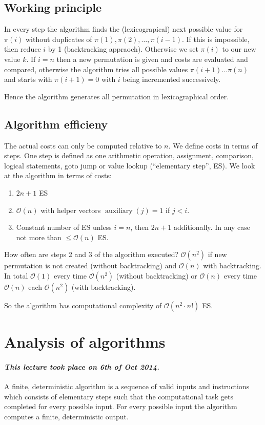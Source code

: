 \documentclass{article}
\newcommand{\dateref}[1]{\paragraph{\textit{This lecture took place on #1.}}}
\begin{document}
\subsection{Working principle}
%
In every step the algorithm finds the (lexicograpical) next possible value for $\pi(i)$ without duplicates of $\pi(1), \pi(2), \ldots, \pi(i-1)$. If this is impossible, then reduce $i$ by 1 (backtracking appraoch). Otherwise we set $\pi(i)$ to our new value $k$. If $i = n$ then a new permutation is given and costs are evaluated and compared, otherwise the algorithm tries all possible values $\pi(i+1)\ldots \pi(n)$ and starts with $\pi(i+1) = 0$ with $i$ being incremented successively.

Hence the algorithm generates all permutation in lexicographical order.

\subsection{Algorithm efficieny}
%
The actual costs can only be computed relative to $n$. We define costs in terms of steps. One step is defined as one arithmetic operation, assignment, comparison, logical statements, goto jump or value lookup (``elementary step'', ES). We look at the algorithm in terms of costs:

\begin{enumerate}
  \item $2n + 1$ ES
  \item $\mathcal{O}(n)$ with helper vectors $\operatorname{auxiliary}(j) = 1$ if $j < i$.
  \item Constant number of ES unless $i=n$, then $2n + 1$ additionally. In any case not more than $\leq \mathcal{O}(n)$ ES.
\end{enumerate}

How often are steps 2 and 3 of the algorithm executed? $\mathcal{O}(n^2)$ if new permutation is not created (without backtracking) and $\mathcal{O}(n)$ with backtracking. In total $\mathcal{O}(1)$ every time $\mathcal{O}(n^2)$ (without backtracking) or $\mathcal{O}(n)$ every time $\mathcal{O}(n)$ each $\mathcal{O}(n^2)$ (with backtracking).

So the algorithm has computational complexity of $\mathcal{O}(n^2 \cdot n!)$ ES.

\section{Analysis of algorithms}
\dateref{6th of Oct 2014}
%
A finite, deterministic algorithm is a sequence of valid inputs and instructions which consists of elementary steps such that the computational task gets completed for every possible input. For every possible input the algorithm computes a finite, deterministic output.
\end{document}
